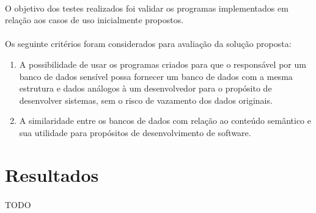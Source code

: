 \paragraph{} O objetivo dos testes realizados foi validar os programas implementados em relação aos casos de uso inicialmente propostos.

\paragraph{} Os seguinte critérios foram considerados para avaliação da solução proposta:

\begin{enumerate}
    \item A possibilidade de usar os programas criados para que o responsável por um banco de dados sensível possa fornecer um banco de dados com a mesma estrutura e dados análogos à um desenvolvedor para o propósito de desenvolver sistemas, sem o risco de vazamento dos dados originais.
    \item A similaridade entre os bancos de dados com relação ao conteúdo semântico e sua utilidade para propósitos de desenvolvimento de software.
\end{enumerate}

\section{Resultados}

\paragraph{} TODO